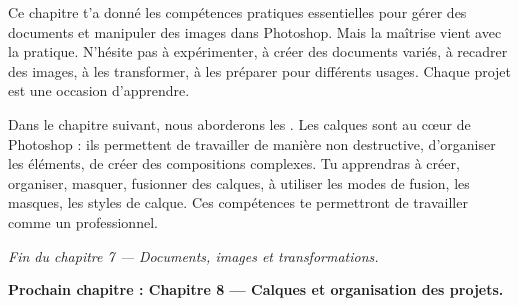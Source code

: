 Ce chapitre t'a donné les compétences pratiques essentielles pour gérer des documents et manipuler des images dans Photoshop. Mais la maîtrise vient avec la pratique. N'hésite pas à expérimenter, à créer des documents variés, à recadrer des images, à les transformer, à les préparer pour différents usages. Chaque projet est une occasion d'apprendre.

Dans le chapitre suivant, nous aborderons les . Les calques sont au cœur de Photoshop : ils permettent de travailler de manière non destructive, d'organiser les éléments, de créer des compositions complexes. Tu apprendras à créer, organiser, masquer, fusionner des calques, à utiliser les modes de fusion, les masques, les styles de calque. Ces compétences te permettront de travailler comme un professionnel.

\vspace{2em}

\begin{center}
\textit{Fin du chapitre 7 --- Documents, images et transformations.}

\vspace{1em}

\textbf{Prochain chapitre : Chapitre 8 --- Calques et organisation des projets.}
\end{center}
